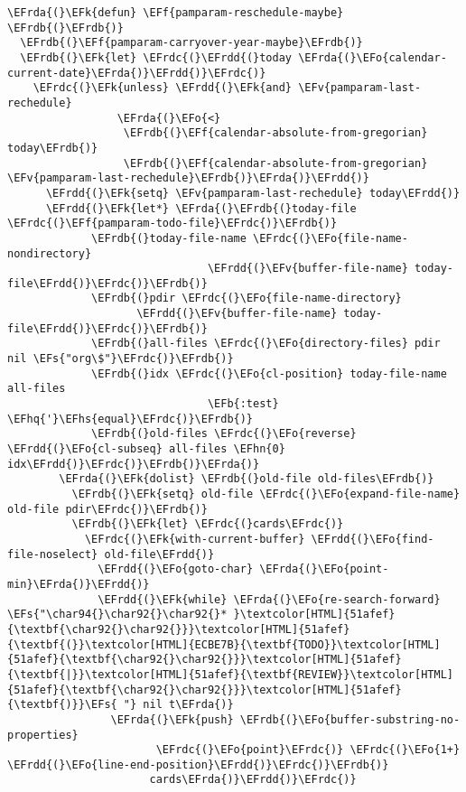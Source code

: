 \documentclass[a4wide,10pt]{article}
\newcommand{\EFs}[1]{\textcolor{EFs}{#1}} %
\newcommand{\EFk}[1]{\textcolor{EFk}{#1}} %
\newcommand{\EFb}[1]{\textcolor{EFb}{#1}} %
\newcommand{\EFf}[1]{\textcolor{EFf}{#1}} %
\newcommand{\EFv}[1]{\textcolor{EFv}{#1}} %
\newcommand{\EFo}[1]{\textcolor{EFo}{#1}} %
\newcommand{\EFhn}[1]{\textcolor{EFhn}{\textbf{#1}}} %
\newcommand{\EFhq}[1]{\textcolor{EFhq}{#1}} %
\newcommand{\EFhs}[1]{\textcolor{EFhs}{#1}} %
\newcommand{\EFrda}[1]{\textcolor{EFrda}{#1}} %
\newcommand{\EFrdb}[1]{\textcolor{EFrdb}{#1}} %
\newcommand{\EFrdc}[1]{\textcolor{EFrdc}{#1}} %
\newcommand{\EFrdd}[1]{\textcolor{EFrdd}{#1}} %
\begin{document}
\begin{Code}
\begin{Verbatim}
\EFrda{(}\EFk{defun} \EFf{pamparam-reschedule-maybe} \EFrdb{(}\EFrdb{)}
  \EFrdb{(}\EFf{pamparam-carryover-year-maybe}\EFrdb{)}
  \EFrdb{(}\EFk{let} \EFrdc{(}\EFrdd{(}today \EFrda{(}\EFo{calendar-current-date}\EFrda{)}\EFrdd{)}\EFrdc{)}
    \EFrdc{(}\EFk{unless} \EFrdd{(}\EFk{and} \EFv{pamparam-last-rechedule}
                 \EFrda{(}\EFo{<}
                  \EFrdb{(}\EFf{calendar-absolute-from-gregorian} today\EFrdb{)}
                  \EFrdb{(}\EFf{calendar-absolute-from-gregorian} \EFv{pamparam-last-rechedule}\EFrdb{)}\EFrda{)}\EFrdd{)}
      \EFrdd{(}\EFk{setq} \EFv{pamparam-last-rechedule} today\EFrdd{)}
      \EFrdd{(}\EFk{let*} \EFrda{(}\EFrdb{(}today-file \EFrdc{(}\EFf{pamparam-todo-file}\EFrdc{)}\EFrdb{)}
             \EFrdb{(}today-file-name \EFrdc{(}\EFo{file-name-nondirectory}
                               \EFrdd{(}\EFv{buffer-file-name} today-file\EFrdd{)}\EFrdc{)}\EFrdb{)}
             \EFrdb{(}pdir \EFrdc{(}\EFo{file-name-directory}
                    \EFrdd{(}\EFv{buffer-file-name} today-file\EFrdd{)}\EFrdc{)}\EFrdb{)}
             \EFrdb{(}all-files \EFrdc{(}\EFo{directory-files} pdir nil \EFs{"org\$"}\EFrdc{)}\EFrdb{)}
             \EFrdb{(}idx \EFrdc{(}\EFo{cl-position} today-file-name all-files
                               \EFb{:test} \EFhq{'}\EFhs{equal}\EFrdc{)}\EFrdb{)}
             \EFrdb{(}old-files \EFrdc{(}\EFo{reverse} \EFrdd{(}\EFo{cl-subseq} all-files \EFhn{0} idx\EFrdd{)}\EFrdc{)}\EFrdb{)}\EFrda{)}
        \EFrda{(}\EFk{dolist} \EFrdb{(}old-file old-files\EFrdb{)}
          \EFrdb{(}\EFk{setq} old-file \EFrdc{(}\EFo{expand-file-name} old-file pdir\EFrdc{)}\EFrdb{)}
          \EFrdb{(}\EFk{let} \EFrdc{(}cards\EFrdc{)}
            \EFrdc{(}\EFk{with-current-buffer} \EFrdd{(}\EFo{find-file-noselect} old-file\EFrdd{)}
              \EFrdd{(}\EFo{goto-char} \EFrda{(}\EFo{point-min}\EFrda{)}\EFrdd{)}
              \EFrdd{(}\EFk{while} \EFrda{(}\EFo{re-search-forward} \EFs{"\char94{}\char92{}\char92{}* }\textcolor[HTML]{51afef}{\textbf{\char92{}\char92{}}}\textcolor[HTML]{51afef}{\textbf{(}}\textcolor[HTML]{ECBE7B}{\textbf{TODO}}\textcolor[HTML]{51afef}{\textbf{\char92{}\char92{}}}\textcolor[HTML]{51afef}{\textbf{|}}\textcolor[HTML]{51afef}{\textbf{REVIEW}}\textcolor[HTML]{51afef}{\textbf{\char92{}\char92{}}}\textcolor[HTML]{51afef}{\textbf{)}}\EFs{ "} nil t\EFrda{)}
                \EFrda{(}\EFk{push} \EFrdb{(}\EFo{buffer-substring-no-properties}
                       \EFrdc{(}\EFo{point}\EFrdc{)} \EFrdc{(}\EFo{1+} \EFrdd{(}\EFo{line-end-position}\EFrdd{)}\EFrdc{)}\EFrdb{)}
                      cards\EFrda{)}\EFrdd{)}\EFrdc{)}

\end{Verbatim}
\end{Code}
\end{document}
